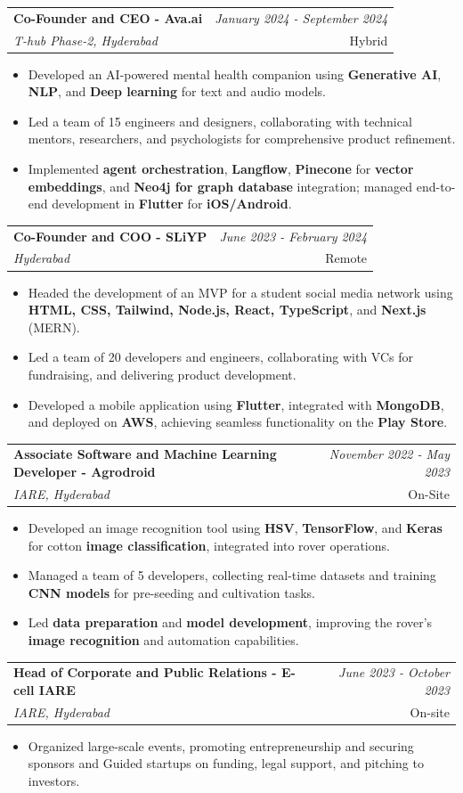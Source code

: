 \documentclass[a4paper,11pt]{article}
\makeatletter
\newcommand{\resumeSubheading}[4]{
\vspace{0.5mm}\item
    \begin{tabular*}{0.98\textwidth}[t]{l@{\extracolsep{\fill}}r}
        \textbf{#1} & \textit{\footnotesize{#4}} \\
        \textit{\footnotesize{#3}} &  \footnotesize{#2}\\
    \end{tabular*}
    \vspace{-2.4mm}
}
\newcommand{\resumeItemListStart}{\begin{itemize}[leftmargin=3ex, labelsep=1mm, itemsep=0.5mm, rightmargin=0pt]}
\newcommand{\resumeItemListEnd}{\end{itemize}\vspace{-2mm}}
\makeatother
\begin{document}
\resumeSubheading
{Co-Founder and CEO - Ava.ai}{Hybrid}
{T-hub Phase-2, Hyderabad}{January 2024 - September 2024}
\resumeItemListStart
\item Developed an AI-powered mental health companion using \textbf{Generative AI}, \textbf{NLP}, and \textbf{Deep learning} for text and audio models.
\item Led a team of 15 engineers and designers, collaborating with technical mentors, researchers, and psychologists for comprehensive product refinement.  
\item Implemented \textbf{agent orchestration}, \textbf{Langflow}, \textbf{Pinecone} for \textbf{vector embeddings}, and \textbf{Neo4j for graph database} integration; managed end-to-end development in \textbf{Flutter} for \textbf{iOS/Android}.
\resumeItemListEnd

\resumeSubheading
{Co-Founder and COO - SLiYP}{Remote}
{Hyderabad}{June 2023 - February 2024}
\resumeItemListStart
\item Headed the development of an MVP for a student social media network using \textbf{HTML, CSS, Tailwind, Node.js, React, TypeScript}, and \textbf{Next.js} (MERN).
\item Led a team of 20 developers and engineers, collaborating with VCs for fundraising, and delivering product development. 
\item Developed a mobile application using \textbf{Flutter}, integrated with \textbf{MongoDB}, and deployed on \textbf{AWS}, achieving seamless functionality on the \textbf{Play Store}. 
\resumeItemListEnd

\resumeSubheading
{Associate Software and Machine Learning Developer - Agrodroid}{On-Site}
{IARE, Hyderabad}{November 2022 - May 2023}
\resumeItemListStart
\item Developed an image recognition tool using \textbf{HSV}, \textbf{TensorFlow}, and \textbf{Keras} for cotton \textbf{image classification}, integrated into rover operations.
\item Managed a team of 5 developers, collecting real-time datasets and training \textbf{CNN models} for pre-seeding and cultivation tasks.
\item Led \textbf{data preparation} and \textbf{model development}, improving the rover's \textbf{image recognition} and automation capabilities.
\resumeItemListEnd

\resumeSubheading
{Head of Corporate and Public Relations - E-cell IARE}{On-site}
{IARE, Hyderabad}{June 2023 - October 2023}
\resumeItemListStart
\item Organized large-scale events, promoting entrepreneurship and securing sponsors and Guided startups on funding, legal support, and pitching to investors.
\resumeItemListEnd
\end{document}
